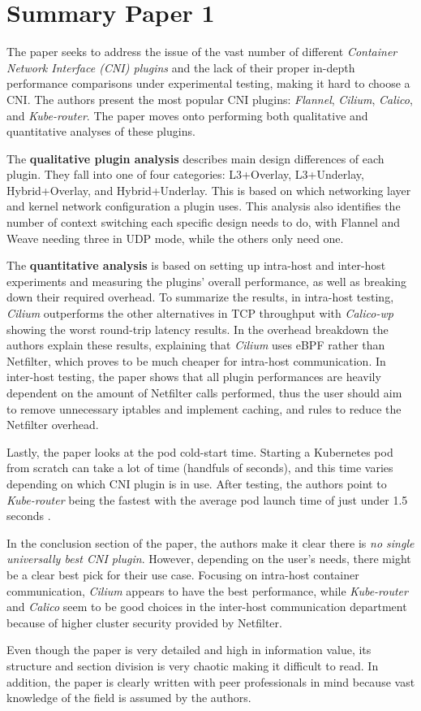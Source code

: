\section{Summary Paper 1}%
\label{sec:Summary Paper 1}
The paper \cite{C1} seeks to address the issue of the vast number of different \emph{Container Network Interface (CNI) plugins} and the lack of their proper in-depth performance comparisons under experimental testing, making it hard to choose a CNI. The authors present the most popular CNI plugins: \textit{Flannel}, \textit{Cilium}, \textit{Calico}, and \textit{Kube-router}. The paper moves onto performing both qualitative and quantitative analyses of these plugins.

The \textbf{qualitative plugin analysis} describes main design differences of each plugin. They fall into one of four categories: L3+Overlay, L3+Underlay, Hybrid+Overlay, and Hybrid+Underlay. This is based on which networking layer and kernel network configuration a plugin uses. This analysis also identifies the number of context switching each specific design needs to do, with Flannel and Weave needing three in UDP mode, while the others only need one.

The \textbf{quantitative analysis} is based on setting up intra-host and inter-host experiments and measuring the plugins' overall performance, as well as breaking down their required overhead. To summarize the results, in intra-host testing, \textit{Cilium} outperforms the other alternatives in TCP throughput with \textit{Calico-wp} showing the worst round-trip latency results. In the overhead breakdown the authors explain these results, explaining that \textit{Cilium} uses eBPF rather than Netfilter, which proves to be much cheaper for intra-host communication. In inter-host testing, the paper shows that all plugin performances are heavily dependent on the amount of Netfilter calls performed, thus the user should aim to remove unnecessary iptables and implement caching, and rules to reduce the Netfilter overhead.

Lastly, the paper looks at the pod cold-start time. Starting a Kubernetes pod from scratch can take a lot of time (handfuls of seconds), and this time varies depending on which CNI plugin is in use. After testing, the authors point to \textit{Kube-router} being the fastest with the average pod launch time of just under 1.5 seconds \cite{C1}.

In the conclusion section of the paper, the authors make it clear there is \emph{no single universally best CNI plugin}. However, depending on the user's needs, there might be a clear best pick for their use case. Focusing on intra-host container communication, \textit{Cilium} appears to have the best performance, while \textit{Kube-router} and \textit{Calico} seem to be good choices in the inter-host communication department because of higher cluster security provided by Netfilter.

Even though the paper is very detailed and high in information value, its structure and section division is very chaotic making it difficult to read. In addition, the paper is clearly written with peer professionals in mind because vast knowledge of the field is assumed by the authors.